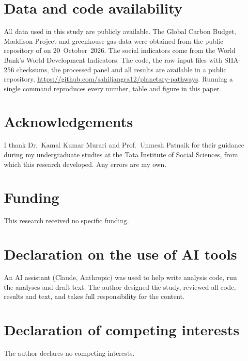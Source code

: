 \section*{Data and code availability}
All data used in this study are publicly available. The Global Carbon Budget, Maddison Project and greenhouse-gas data were obtained from the public repository of \citet{owid2025co2} on 20~October~2026. The social indicators come from the World Bank's World Development Indicators. The code, the raw input files with SHA-256 checksums, the processed panel and all results are available in a public repository, \url{https://github.com/sahiljangra12/planetary-pathways}. Running a single command reproduces every number, table and figure in this paper.

\section*{Acknowledgements}
I thank Dr.\ Kamal Kumar Murari and Prof.\ Unmesh Patnaik for their guidance during my undergraduate studies at the Tata Institute of Social Sciences, from which this research developed. Any errors are my own.

\section*{Funding}
This research received no specific funding.

\section*{Declaration on the use of AI tools}
An AI assistant (Claude, Anthropic) was used to help write analysis code, run the analyses and draft text. The author designed the study, reviewed all code, results and text, and takes full responsibility for the content.

\section*{Declaration of competing interests}
The author declares no competing interests.
